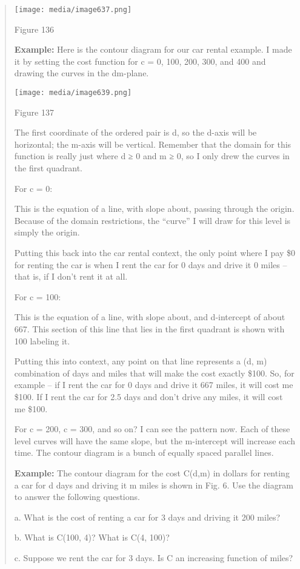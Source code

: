 \begin{quote}
\texttt{[image: media/image637.png]}

Figure 136

\textbf{Example:} Here is the contour diagram for our car rental
example. I made it by setting the cost function for c = 0, 100, 200,
300, and 400 and drawing the curves in the dm-plane.

\texttt{[image: media/image639.png]}

Figure 137

The first coordinate of the ordered pair is d, so the d-axis will be
horizontal; the m-axis will be vertical. Remember that the domain for
this function is really just where d ≥ 0 and m ≥ 0, so I only drew the
curves in the first quadrant.

For c = 0:

This is the equation of a line, with slope about, passing through the
origin. Because of the domain restrictions, the ``curve'' I will draw
for this level is simply the origin.

Putting this back into the car rental context, the only point where I
pay \$0 for renting the car is when I rent the car for 0 days and drive
it 0 miles -- that is, if I don't rent it at all.

For c = 100:

This is the equation of a line, with slope about, and d-intercept of
about 667. This section of this line that lies in the first quadrant is
shown with 100 labeling it.

Putting this into context, any point on that line represents a (d, m)
combination of days and miles that will make the cost exactly \$100. So,
for example -- if I rent the car for 0 days and drive it 667 miles, it
will cost me \$100. If I rent the car for 2.5 days and don't drive any
miles, it will cost me \$100.

For c = 200, c = 300, and so on? I can see the pattern now. Each of
these level curves will have the same slope, but the m-intercept will
increase each time. The contour diagram is a bunch of equally spaced
parallel lines.

\textbf{Example:} The contour diagram for the cost C(d,m) in dollars for
renting a car for d days and driving it m miles is shown in Fig. 6. Use
the diagram to answer the following questions.

a. What is the cost of renting a car for 3 days and driving it 200
miles?

b. What is C(100, 4)? What is C(4, 100)?

c. Suppose we rent the car for 3 days. Is C an increasing function of
miles?
\end{quote}

